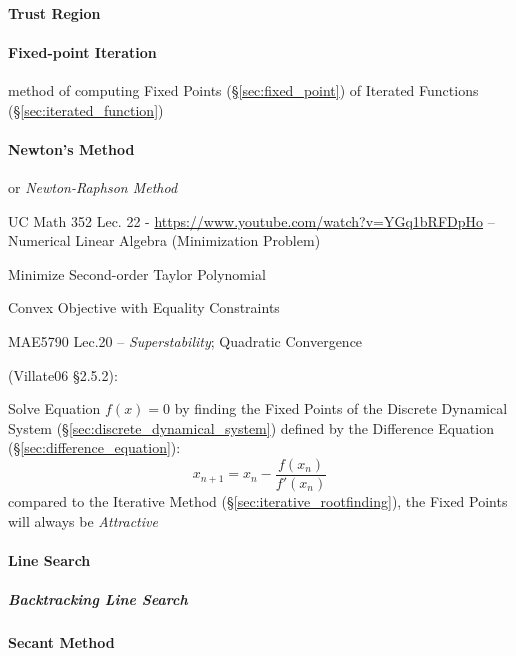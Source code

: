\paragraph{Trust Region}\label{sec:trust_region}\hfill

\paragraph{Fixed-point Iteration}\label{sec:fixedpoint_iteration}\hfill

method of computing Fixed Points (\S\ref{sec:fixed_point}) of Iterated Functions
(\S\ref{sec:iterated_function})



\paragraph{Newton's Method}\label{sec:newtons_method}\hfill

or \emph{Newton-Raphson Method}

UC Math 352 Lec. 22 - \url{https://www.youtube.com/watch?v=YGq1bRFDpHo} --
Numerical Linear Algebra (Minimization Problem)

Minimize Second-order Taylor Polynomial

Convex Objective with Equality Constraints

MAE5790 Lec.20 -- \emph{Superstability}; Quadratic Convergence

(Villate06 \S 2.5.2):

Solve Equation $f(x) = 0$ by finding the Fixed Points of the Discrete Dynamical
System (\S\ref{sec:discrete_dynamical_system}) defined by the Difference
Equation (\S\ref{sec:difference_equation}):
\[
  x_{n+1} = x_n - \frac{f(x_n)}{f'(x_n)}
\]
compared to the Iterative Method (\S\ref{sec:iterative_rootfinding}), the Fixed
Points will always be \emph{Attractive}



\paragraph{Line Search}\label{sec:line_search}\hfill

\subparagraph{Backtracking Line Search}\label{sec:backtracking_line_search}
\hfill



\paragraph{Secant Method}\label{sec:secant_method}\hfill

